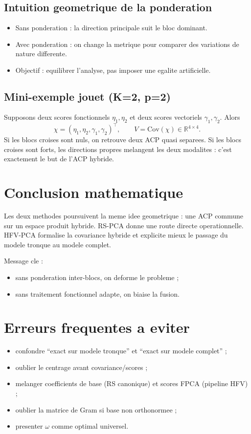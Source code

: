 \documentclass[11pt,a4paper]{article}
\begin{document}
\subsection{Intuition geometrique de la ponderation}
\begin{itemize}[leftmargin=1.5em]
  \item Sans ponderation : la direction principale suit le bloc dominant.
  \item Avec ponderation : on change la metrique pour comparer des variations
  de nature differente.
  \item Objectif : equilibrer l'analyse, pas imposer une egalite artificielle.
\end{itemize}

\subsection{Mini-exemple jouet (K=2, p=2)}
\label{subsec:jouet}

Supposons deux scores fonctionnels $\eta_1,\eta_2$ et deux scores vectoriels
$\gamma_1,\gamma_2$. Alors
\[
\chi=(\eta_1,\eta_2,\gamma_1,\gamma_2)^\top,\qquad
V=\mathrm{Cov}(\chi)\in\mathbb{R}^{4\times4}.
\]
Si les blocs croises sont nuls, on retrouve deux ACP quasi separees. Si les
blocs croises sont forts, les directions propres melangent les deux modalites :
c'est exactement le but de l'ACP hybride.

\section{Conclusion mathematique}

Les deux methodes poursuivent la meme idee geometrique :
une ACP commune sur un espace produit hybride.
RS-PCA donne une route directe operationnelle.
HFV-PCA formalise la covariance hybride et explicite mieux
le passage du modele tronque au modele complet.

Message cle :
\begin{itemize}[leftmargin=1.5em]
  \item sans ponderation inter-blocs, on deforme le probleme ;
  \item sans traitement fonctionnel adapte, on biaise la fusion.
\end{itemize}

\section{Erreurs frequentes a eviter}
\begin{itemize}[leftmargin=1.5em]
  \item confondre ``exact sur modele tronque'' et ``exact sur modele complet'' ;
  \item oublier le centrage avant covariance/scores ;
  \item melanger coefficients de base (RS canonique) et scores FPCA (pipeline HFV) ;
  \item oublier la matrice de Gram si base non orthonormee ;
  \item presenter $\omega$ comme optimal universel.
\end{itemize}
\end{document}
